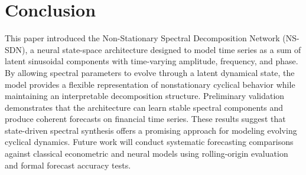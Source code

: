 \section{Conclusion}
This paper introduced the Non-Stationary Spectral Decomposition Network (NS-SDN), a neural state-space architecture designed to model time series as a sum of latent sinusoidal components with time-varying amplitude, frequency, and phase. By allowing spectral parameters to evolve through a latent dynamical state, the model provides a flexible representation of nonstationary cyclical behavior while maintaining an interpretable decomposition structure. Preliminary validation demonstrates that the architecture can learn stable spectral components and produce coherent forecasts on financial time series. These results suggest that state-driven spectral synthesis offers a promising approach for modeling evolving cyclical dynamics. Future work will conduct systematic forecasting comparisons against classical econometric and neural models using rolling-origin evaluation and formal forecast accuracy tests.
